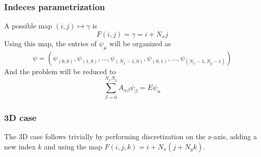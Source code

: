 \documentclass{article}
\begin{document}
\subsubsection{Indeces parametrization}
A possible map $(i, j) \mapsto \gamma$ is
\begin{equation}
F(i, j) = \gamma = i + N_x j \label{eq:indeces_parametrization}
    \end{equation}
Using this map, the entries of $\psi_\mu$ will be organized as 
\begin{equation}
\psi = (\psi_{(0, 0)}, \psi_{(1, 0)}, \ldots, \psi_{(N_x-1, 0)}, \psi_{(0, 1)}, \ldots, \psi_{(N_x-1, N_y-1)})
\end{equation}
And the problem will be reduced to 
\begin{equation}
\sum_{\beta=0}^{N_x N_y}A_{\alpha\beta}\psi_{\beta} = E\psi_\alpha
\end{equation}
\subsubsection{3D case}
The 3D case follows trivially by performing discretization on the z-axis, adding a new index $k$ and using the map $F(i, j, k) = i + N_x (j + N_y k)$.

\end{document}
